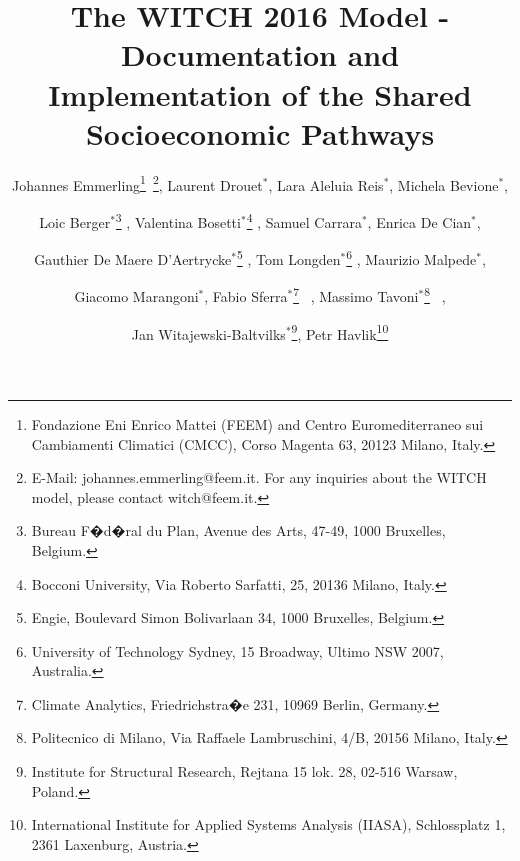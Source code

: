 

\title{The WITCH 2016 Model - Documentation and Implementation of the Shared
Socioeconomic Pathways}


\author{Johannes Emmerling\thanks{Fondazione Eni Enrico Mattei (FEEM) and Centro Euromediterraneo sui
Cambiamenti Climatici (CMCC), Corso Magenta 63, 20123 Milano, Italy.}~\thanks{E-Mail: johannes.emmerling@feem.it. For any inquiries about the WITCH
model, please contact witch@feem.it.}, Laurent Drouet$^{*}$, Lara Aleluia Reis$^{*}$, Michela Bevione$^{*}$,
\and Loic Berger$^{*}$\thanks{Bureau F�d�ral du Plan, Avenue des Arts, 47-49, 1000 Bruxelles, Belgium.}
, Valentina Bosetti$^{*}$\thanks{Bocconi University, Via Roberto Sarfatti, 25, 20136 Milano, Italy.}
, Samuel Carrara$^{*}$, Enrica De Cian$^{*}$, \and Gauthier De
Maere D'Aertrycke$^{*}$\thanks{Engie, Boulevard Simon Bolivarlaan 34, 1000 Bruxelles, Belgium.}
, Tom Longden$^{*}$\thanks{University of Technology Sydney, 15 Broadway, Ultimo NSW 2007, Australia.}
, Maurizio Malpede$^{*}$, \and Giacomo Marangoni$^{*}$, Fabio Sferra$^{*}$\thanks{Climate Analytics, Friedrichstra�e 231, 10969 Berlin, Germany.}
~, Massimo Tavoni$^{*}$\thanks{Politecnico di Milano, Via Raffaele Lambruschini, 4/B, 20156 Milano,
Italy.} ~, \and Jan Witajewski-Baltvilks$^{*}$\thanks{Institute for Structural Research, Rejtana 15 lok. 28, 02-516 Warsaw,
Poland. }, Petr Havlik\thanks{International Institute for Applied Systems Analysis (IIASA), Schlossplatz
1, 2361 Laxenburg, Austria.}}
\maketitle
